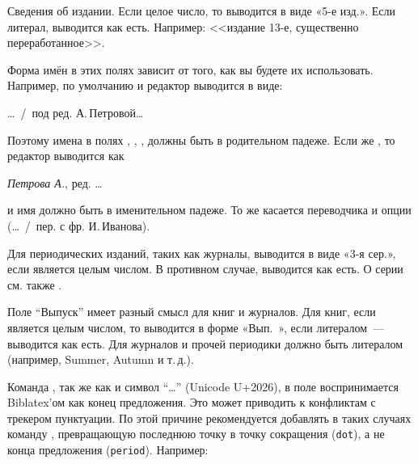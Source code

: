\documentclass[10pt,a4paper,headings=small,numbers=enddot,english,russian]{ltxdockit}[2011/03/25]
\newcommand*{\biblatex}{Biblatex\xspace}
\newenvironment{bibexample}{\begin{list}{}{}}{\end{list}}
\begin{document}
\begin{fieldlist}

Сведения об издании. Если целое число, то выводится в виде «5-е изд.». Если литерал, выводится как есть. Например: <<издание 13-е, существенно переработанное>>.  


Форма имён в этих полях зависит от того, как вы будете их использовать. 
Например, по умолчанию   и редактор выводится в виде:

\begin{bibexample}
\item \ldots\ \slash\ под ред. А.\,Петровой\ldots
\end{bibexample} 

Поэтому имена в полях , , , 
 должны быть в родительном падеже. Если же , 
то редактор выводится как 

\begin{bibexample}
\item \textit{Петрова А.}, ред. \ldots 
\end{bibexample} 

и имя должно быть в именительном падеже. То же касается переводчика и опции 
(\ldots~/~пер. с фр.  И.\,Иванова). 


Для периодических изданий, таких как журналы, выводится в виде «3-я сер.», если
является целым числом. В противном случае, выводится как есть. 
О серии см. также .


Поле \enquote{Выпуск} имеет разный смысл для книг и журналов. Для книг, если является 
целым числом, то выводится в форме «Вып.~», если литералом~--- выводится как есть.
Для журналов и прочей периодики должно быть литералом (например, Summer, Autumn и т.\,д.).

\label{ellipsis}

Команда , так же как и символ \enquote{…} (Unicode U+2026), в поле  воспринимается \biblatex'ом
как конец предложения. Это может приводить к конфликтам с трекером пунктуации. 
По этой причине рекомендуется добавлять в таких случаях
команду , превращающую
последнюю точку в точку сокращения (\texttt{dot}), а не конца предложения 
(\texttt{period}). Например: 


\end{fieldlist}
\end{document}
